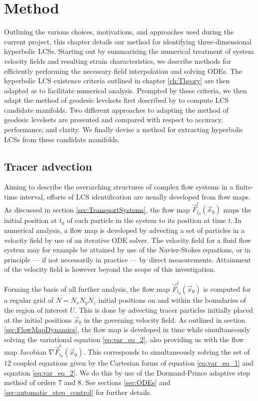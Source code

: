 \chapter[Method]{Method}\label{ch:Method}

Outlining the various choices, motivations, and approaches used during the current project, this chapter details our method for identifying three-dimensional hyperbolic LCSs. Starting out by summarizing the numerical treatment of system velocity fields and resulting strain characteristics, we describe methods for efficiently performing the necessary field interpolation and solving ODEs. The hyperbolic LCS existence criteria outlined in chapter \ref{ch:Theory} are then adapted as to facilitate numerical analysis. Prompted by these criteria, we then adapt the method of geodesic levelsets first described by \cite{GeodesicLevelSets} to compute LCS candidate manifolds. Two different approaches to adapting the method of geodesic levelsets are presented and compared with respect to accuracy, performance, and clarity. We finally devise a method for extracting hyperbolic LCSs from these candidate manifolds. 

\section{Tracer advection}\label{sec:tracer_advection}

Aiming to describe the overarching structures of complex flow systems in a finite-time interval, efforts of LCS identification are usually developed from flow maps. As discussed in section \ref{sec:TransportSystems}, the flow map $\vec{F}_{t_0}^t(\vec{x}_0)$ maps the initial position at $t_0$ of each particle in the system to its position at time $t$. In numerical analysis, a flow map is developed by advecting a set of particles in a velocity field  by use of an iterative ODE solver. The velocity field for a fluid flow system may for example be attained by use of the Navier-Stokes equations, or in principle --- if not necessarily in practice --- by direct measurements. Attainment of the velocity field is however beyond the scope of this investigation.

Forming the basis of all further analysis, the flow map $\vec{F}_{t_0}^t(\vec{x}_0)$ is computed for a regular grid of $N=N_xN_yN_z$ initial positions on and within the boundaries of the region of interest $U$. This is done by advecting tracer particles initially placed at the initial positions $\vec{x}_0$ in the governing velocity field. As outlined in section \ref{sec:FlowMapDynamics}, the flow map is developed in time while simultaneously solving the variational equation \eqref{eq:var_eq_2}, also providing us with the flow map Jacobian $\nabla\vec{F}_{t_0}^t(\vec{x}_0)$. This corresponds to simultaneously solving the set of $12$ coupled equations given by the Cartesian forms of equation \eqref{eq:var_eq_1} and equation \eqref{eq:var_eq_2}. We do this by use of the Dormand-Prince adaptive step method of orders $7$ and $8$. See sections \ref{sec:ODEs} and \ref{sec:automatic_step_control} for further details. 

